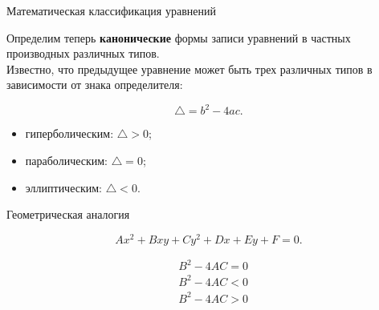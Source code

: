 \documentclass[10pt,xcolor=pst,aspectratio=169]{beamer}
\begin{document}
\begin{frame}{Математическая классификация уравнений}

    \transdissolve[duration=0.1]
    \justifying
    \large

    Определим теперь \textbf{канонические} формы записи уравнений в частных производных различных типов.\\

    Известно, что предыдущее уравнение может быть трех различных типов в зависимости от знака определителя:

    \[
        \triangle = b^{2} - 4 a c.
    \]

    \begin{itemize}
        \item гиперболическим: $\triangle > 0$;
        \item параболическим: $\triangle = 0$;
        \item эллиптическим: $\triangle < 0$.
    \end{itemize}

\end{frame}

\begin{frame}{Геометрическая аналогия}

    \transdissolve[duration=0.1]
    \justifying
    \large

    \vspace{-60pt}

    \[
        A x^{2} + B x y + C y^{2} + D x + E y + F = 0.
    \]

    \begin{figure}
        \vspace{-20pt}
    \end{figure}

    \[
        \begin{split}
            &B^{2} - 4 A C = 0 \\
            &B^{2} - 4 A C < 0 \\
            &B^{2} - 4 A C > 0
        \end{split}
    \]

\end{frame}
\end{document}
